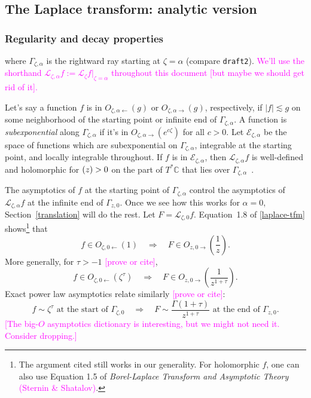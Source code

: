 \documentclass{article}
\let\Re\relax
\DeclareMathOperator{\Re}{Re}
\newcommand{\maps}{\colon}
\newcommand{\C}{\mathbb{C}}
\newcommand{\laplace}{\mathcal{L}}
\begin{document}
\subsection{The Laplace transform: analytic version}
\subsubsection{Regularity and decay properties}\label{reg-decay}
where $\Gamma_{\zeta, \alpha}$ is the rightward ray starting at $\zeta = \alpha$ (compare {\tt draft2}). \textcolor{magenta}{We'll use the shorthand $\laplace_{\zeta, \alpha} f := \laplace_\zeta f \big|_{\zeta = \alpha}$ throughout this document [but maybe we should get rid of it].}

Let's say a function $f$ is in $O_{\zeta, \alpha \leftarrow}(g)$ or $O_{\zeta, \alpha \rightarrow}(g)$, respectively, if $|f| \lesssim g$ on some neighborhood of the starting point or infinite end of $\Gamma_{\zeta, \alpha}$. A function is {\em subexponential} along $\Gamma_{\zeta, \alpha}$ if it's in $O_{\zeta, \alpha \rightarrow}(e^{c\zeta})$ for all $c > 0$. Let $\mathcal{E}_{\zeta, \alpha}$ be the space of functions which are subexponential on $\Gamma_{\zeta, \alpha}$, integrable at the starting point, and locally integrable throughout. If $f$ is in $\mathcal{E}_{\zeta, \alpha}$, then $\laplace_{\zeta, \alpha} f$ is well-defined and holomorphic for $\Re(z) > 0$ on the part of $T^*\C$ that lies over $\Gamma_{\zeta, \alpha}$~\cite[\S 5.6]{diverg-resurg-i}.

The asymptotics of $f$ at the starting point of $\Gamma_{\zeta, \alpha}$ control the asymptotics of $\laplace_{\zeta, \alpha} f$ at the infinite end of $\Gamma_{z, 0}$. Once we see how this works for $\alpha = 0$, Section~\ref{translation} will do the rest. Let $F = \laplace_{\zeta, 0} f$. Equation~1.8 of \ref{laplace-tfm} shows\footnote{The argument cited still works in our generality. For holomorphic $f$, one can also use Equation 1.5 of {\em Borel-Laplace Transform and Asymptotic Theory} \textcolor{magenta}{(Sternin \& Shatalov)}.} that
\[ f \in O_{\zeta, 0 \leftarrow}(1) \quad\Longrightarrow\quad F \in O_{z, 0 \rightarrow}\left(\frac{1}{z}\right). \]
More generally, for $\tau > -1$ \textcolor{magenta}{[prove or cite]},
\[ f \in O_{\zeta, 0 \leftarrow}(\zeta^\tau) \quad\Longrightarrow\quad F \in O_{z, 0 \rightarrow}\left(\frac{1}{z^{1 + \tau}}\right). \]
Exact power law asymptotics relate similarly \textcolor{magenta}{[prove or cite]}:
\[ f \sim \zeta^\tau \text{ at the start of } \Gamma_{\zeta, 0} \quad\Longrightarrow\quad F \sim \frac{\Gamma(1+\tau)}{z^{1+\tau}} \text{ at the end of } \Gamma_{z, 0}. \]
\textcolor{magenta}{[The big-$O$ asymptotics dictionary is interesting, but we might not need it. Consider dropping.]}
\end{document}

